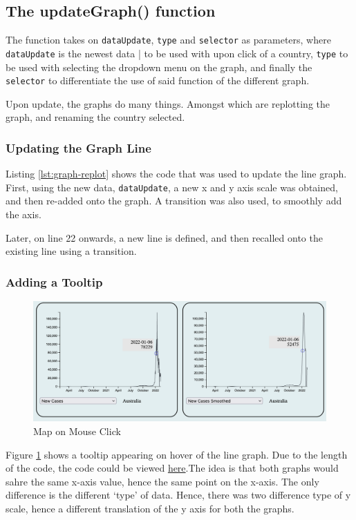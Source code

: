 \documentclass{scrreprt}
\begin{document}
\subsection{The updateGraph() function}
The function takes on \verb|dataUpdate|, \verb|type| and \verb|selector| as parameters, where \verb|dataUpdate| is the newest data | to be used with upon click of a country, \verb|type| to be used with selecting the dropdown menu on the graph, and finally the \verb|selector| to differentiate the use of said function of the different graph. 

Upon update, the graphs do many things. Amongst which are replotting the graph, and renaming the country selected. 

\subsubsection{Updating the Graph Line}

Listing \ref{lst:graph-replot} shows the code that was used to update the line graph. First, using the new data, \verb|dataUpdate|, a new x and y axis scale was obtained, and then re-added onto the graph. A transition was also used, to smoothly add the axis. 

Later, on line 22 onwards, a new line is defined, and then recalled onto the existing line using a transition. 

\subsubsection{Adding a Tooltip}
\begin{figure}[H]
    \centering
    \includegraphics[width=\textwidth]{images/graph-tooltip.png}
    \caption{Map on Mouse Click}
    \label{fig:graph-tooltip}
\end{figure}
Figure \ref{fig:graph-tooltip} shows a tooltip appearing on hover of the line graph. Due to the length of the code, the code could be viewed \href{https://github.com/jonleesy/F21DV-Coursework/blob/main/public/js/part3/graph.js}{here}.The idea is that both graphs would sahre the same x-axis value, hence the same point on the x-axis. The only difference is the different `type' of data. Hence, there was two difference type of y scale, hence a different translation of the y axis for both the graphs. 
\end{document}
